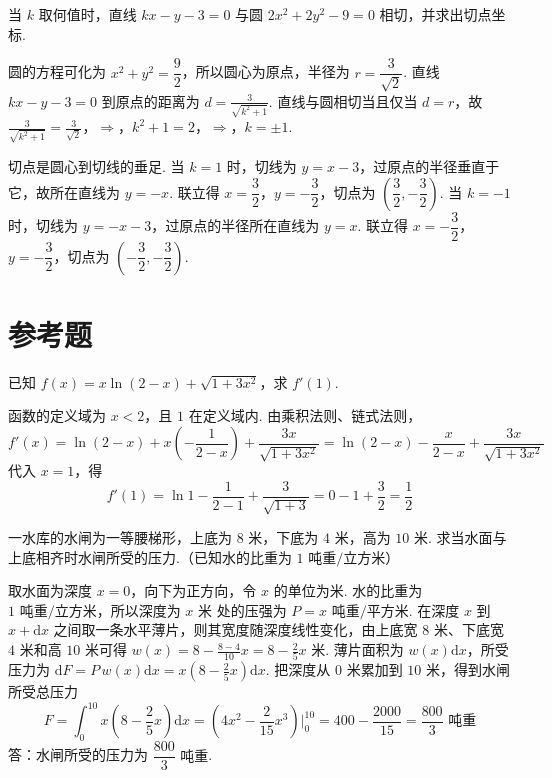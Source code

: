 \begin{problem}
当 \( k \) 取何值时，直线 \( kx-y-3=0 \) 与圆 \( 2x^2+2y^2-9=0 \) 相切，并求出切点坐标.
\end{problem}

\begin{solution}
圆的方程可化为 \(x^2+y^2=\dfrac{9}{2}\)，所以圆心为原点，半径为 \(r=\dfrac{3}{\sqrt{2}}\). 直线 \(kx-y-3=0\) 到原点的距离为
\(d=\frac{3}{\sqrt{k^2+1}}\).
直线与圆相切当且仅当 \(d=r\)，故
\(\frac{3}{\sqrt{k^2+1}}=\frac{3}{\sqrt2}\)，\(\Longrightarrow\)，\(k^2+1=2\)，\(\Longrightarrow\)，\(k=\pm1\).

切点是圆心到切线的垂足. 当 \(k=1\) 时，切线为 \(y=x-3\)，过原点的半径垂直于它，故所在直线为 \(y=-x\). 联立得 \(x=\dfrac{3}{2}\)，\(y=-\dfrac{3}{2}\)，切点为 \(\left(\dfrac{3}{2},-\dfrac{3}{2}\right)\). 当 \(k=-1\) 时，切线为 \(y=-x-3\)，过原点的半径所在直线为 \(y=x\). 联立得 \(x=-\dfrac{3}{2}\)，\(y=-\dfrac{3}{2}\)，切点为 \(\left(-\dfrac{3}{2},-\dfrac{3}{2}\right)\).
\end{solution}

\section{参考题}

\begin{problem}
已知 \( f(x)=x\ln(2-x)+\sqrt{1+3x^2} \)，求 \( f'(1) \).
\end{problem}

\begin{solution}
函数的定义域为 \(x<2\)，且 \(1\) 在定义域内. 由乘积法则、链式法则，
\[
f'(x)=\ln(2-x)+x\left(-\frac{1}{2-x}\right)+\frac{3x}{\sqrt{1+3x^2}}=\ln(2-x)-\frac{x}{2-x}+\frac{3x}{\sqrt{1+3x^2}}
\]
代入 \(x=1\)，得
\[
f'(1)=\ln1-\frac{1}{2-1}+\frac{3}{\sqrt{1+3}}=0-1+\frac{3}{2}=\frac{1}{2}
\]
\end{solution}

\begin{problem}
一水库的水闸为一等腰梯形，上底为 \(8\text{ 米}\)，下底为 \(4\text{ 米}\)，高为 \(10\text{ 米}\). 求当水面与上底相齐时水闸所受的压力.（已知水的比重为 \(1\text{ 吨重/立方米}\)）

\end{problem}

\begin{solution}
取水面为深度 \(x=0\)，向下为正方向，令 \(x\) 的单位为米. 水的比重为 \(1\text{ 吨重/立方米}\)，所以深度为 \(x\text{ 米}\) 处的压强为 \(P=x\text{ 吨重/平方米}\). 在深度 \(x\) 到 \(x+\mathrm{d}x\) 之间取一条水平薄片，则其宽度随深度线性变化，由上底宽 \(8\) 米、下底宽 \(4\) 米和高 \(10\) 米可得
\(w(x)=8-\frac{8-4}{10}x=8-\frac{2}{5}x\text{ 米}\). 薄片面积为 \(w(x)\mathrm{d}x\)，所受压力为 \(\mathrm{d}F=P\,w(x)\mathrm{d}x=x\left(8-\frac{2}{5}x\right)\mathrm{d}x\).
把深度从 \(0\) 米累加到 \(10\) 米，得到水闸所受总压力
\[
F=\int_0^{10}x\left(8-\frac{2}{5}x\right)\mathrm{d}x
=\left(4x^2-\frac{2}{15}x^3\right)\Big|_0^{10}
=400-\frac{2000}{15}=\frac{800}{3}\text{ 吨重}
\]
答：水闸所受的压力为 \(\dfrac{800}{3}\text{ 吨重}\).
\end{solution}
